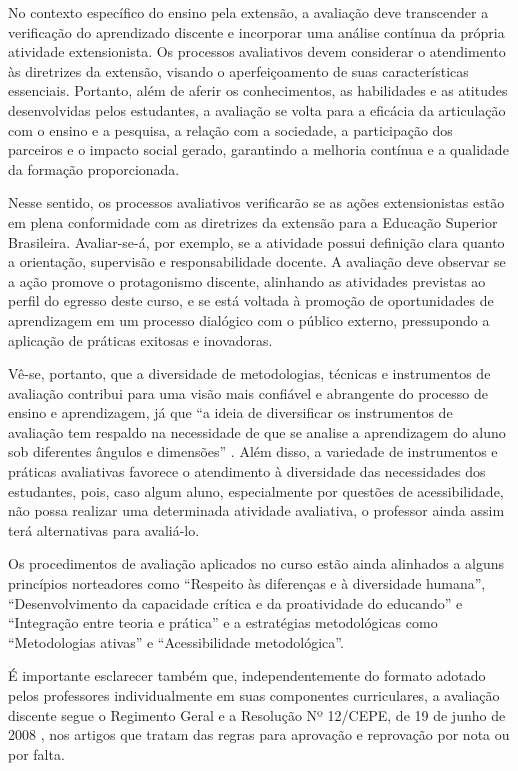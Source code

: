 No contexto específico do ensino pela extensão, a avaliação deve transcender a verificação do aprendizado discente e incorporar uma análise contínua da própria atividade extensionista. Os processos avaliativos devem considerar o atendimento às diretrizes da extensão, visando o aperfeiçoamento de suas características essenciais. Portanto, além de aferir os conhecimentos, as habilidades e as atitudes desenvolvidas pelos estudantes, a avaliação se volta para a eficácia da articulação com o ensino e a pesquisa, a relação com a sociedade, a participação dos parceiros e o impacto social gerado, garantindo a melhoria contínua e a qualidade da formação proporcionada.

Nesse sentido, os processos avaliativos verificarão se as ações extensionistas estão em plena conformidade com as diretrizes da extensão para a Educação Superior Brasileira. Avaliar-se-á, por exemplo, se a atividade possui definição clara quanto a orientação, supervisão e responsabilidade docente. A avaliação deve observar se a ação promove o protagonismo discente, alinhando as atividades previstas ao perfil do egresso deste curso, e se está voltada à promoção de oportunidades de aprendizagem em um processo dialógico com o público externo, pressupondo a aplicação de práticas exitosas e inovadoras.

Vê-se, portanto, que a diversidade de metodologias, técnicas e instrumentos de avaliação contribui para uma visão mais confiável e abrangente do processo de ensino e aprendizagem, já que “a ideia de diversificar os instrumentos de avaliação tem respaldo na necessidade de que se analise a aprendizagem do aluno sob diferentes ângulos e dimensões” \cite[p. 95]{depresbiteris2017diversificar}. Além disso, a variedade de instrumentos e práticas avaliativas favorece o atendimento à diversidade das necessidades dos estudantes, pois, caso algum aluno, especialmente por questões de acessibilidade, não possa realizar uma determinada atividade avaliativa, o professor ainda assim terá alternativas para avaliá-lo.

Os procedimentos de avaliação aplicados no curso estão ainda alinhados a alguns princípios norteadores como “Respeito às diferenças e à diversidade humana”, “Desenvolvimento da capacidade crítica e da proatividade do educando” e “Integração entre teoria e prática” e a estratégias metodológicas como “Metodologias ativas” e “Acessibilidade metodológica”.

É importante esclarecer também que, independentemente do formato adotado pelos professores individualmente em suas componentes curriculares, a avaliação discente segue o Regimento Geral \cite{ufc_regimento_geral_2019} e a Resolução Nº 12/CEPE, de 19 de junho de 2008 \cite{ufc_resolucao_12_cepe_2008}, nos artigos que tratam das regras para aprovação e reprovação por nota ou por falta.

